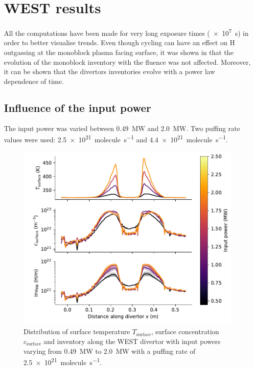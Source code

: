 \section{WEST results}

All the computations have been made for very long exposure times (\SI{e7}{s}) in order to better visualise trends.
Even though cycling can have an effect on H outgassing at the monoblock plasma facing surface, it was shown in  that the evolution of the monoblock inventory with the fluence was not affected.
Moreover, it can be shown that the divertors inventories evolve with a power law dependence of time.

\subsection{Influence of the input power}

The input power was varied between \SI{0.49}{MW} and \SI{2.0}{MW}.
Two puffing rate values were used: \SI{2.5e21}{molecule.s^{-1}} and \SI{4.4e21}{molecule.s^{-1}}.

\begin{figure}[h]
    \centering
    \includegraphics[width=\linewidth]{Figures/Chapter4/WEST/inventory_along_divertor_input_power.pdf}
    \caption{Distribution of surface temperature $T_\mathrm{surface}$, surface concentration $c_\mathrm{surface}$ and inventory along the WEST divertor with input powers varying from \SI{0.49}{MW} to \SI{2.0}{MW} with a puffing rate of \SI{2.5e21}{molecule.s^{-1}}.}
\end{figure}

